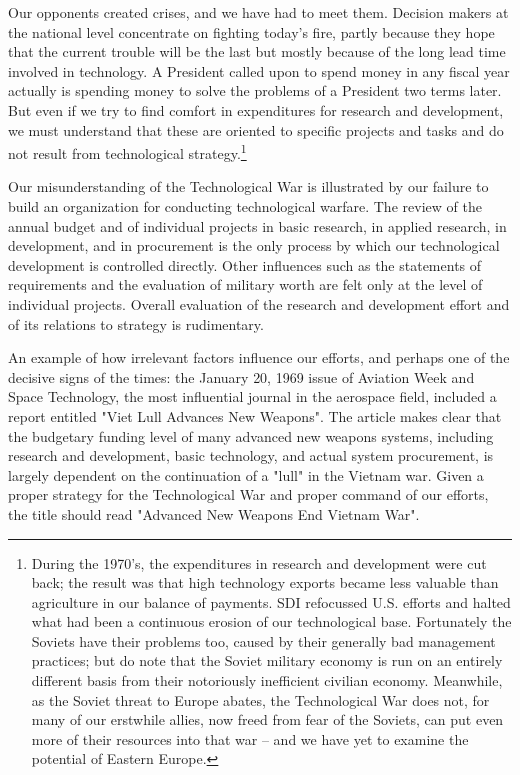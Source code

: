 \documentclass[a4paper,12pt]{book}
\begin{document}
Our opponents created crises, and we have had to meet them. Decision makers at the national level concentrate on fighting today's fire, partly because they hope that the current trouble will be the last but mostly because of the long lead time involved in technology. A President called upon to spend money in any fiscal year actually is spending money to solve the problems of a President two terms later. But even if we try to find comfort in expenditures for research and development, we must understand that these are oriented to specific projects and tasks and do not result from technological strategy.\footnote{
During the 1970's, the expenditures in research and development were cut back; the result was that high technology exports became less valuable than agriculture in our balance of payments. SDI refocussed U.S. efforts and halted what had been a continuous erosion of our technological base. Fortunately the Soviets have their problems too, caused by their generally bad management practices; but do note that the Soviet military economy is run on an entirely different basis from their notoriously inefficient civilian economy. Meanwhile, as the Soviet threat to Europe abates, the Technological War does not, for many of our erstwhile allies, now freed from fear of the Soviets, can put even more of their resources into that war -- and we have yet to examine the potential of Eastern Europe.}

Our misunderstanding of the Technological War is illustrated by our failure to build an organization for conducting technological warfare. The review of the annual budget and of individual projects in basic research, in applied research, in development, and in procurement is the only process by which our technological development is controlled directly. Other influences such as the statements of requirements and the evaluation of military worth are felt only at the level of individual projects. Overall evaluation of the research and development effort and of its relations to strategy is rudimentary.

An example of how irrelevant factors influence our efforts, and perhaps one of the decisive signs of the times: the January 20, 1969 issue of Aviation Week and Space Technology, the most influential journal in the aerospace field, included a report entitled "Viet Lull Advances New Weapons". The article makes clear that the budgetary funding level of many advanced new weapons systems, including research and development, basic technology, and actual system procurement, is largely dependent on the continuation of a "lull" in the Vietnam war. Given a proper strategy for the Technological War and proper command of our efforts, the title should read "Advanced New Weapons End Vietnam War".
\end{document}
